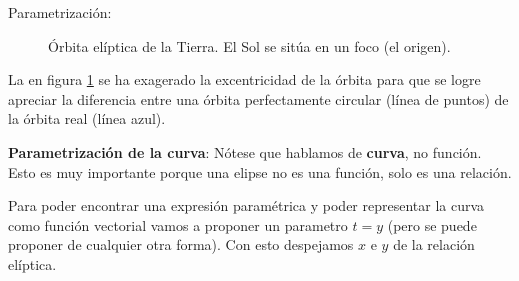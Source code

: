 \begin{example}{Parametrización:}
\begin{figure}[ht]
    \caption{Órbita elíptica de la Tierra. El Sol se sitúa en un foco (el origen).}
    \label{fig:orbita_conceptual}
  \end{figure}
  La en figura \ref{fig:orbita_conceptual} se ha exagerado la excentricidad de la órbita para que se logre apreciar la diferencia entre una órbita perfectamente circular (línea de puntos) de la órbita real (línea azul).

  \textbf{Parametrización de la curva}: Nótese que hablamos de \textbf{curva}, no función. Esto es muy importante porque una elipse no es una función, solo es una relación.

  Para poder encontrar una expresión paramétrica y poder representar la curva como función vectorial vamos a proponer un parametro $t=y$ (pero se puede proponer de cualquier otra forma). Con esto despejamos $x$ e $y$ de la relación elíptica.


\end{example}
